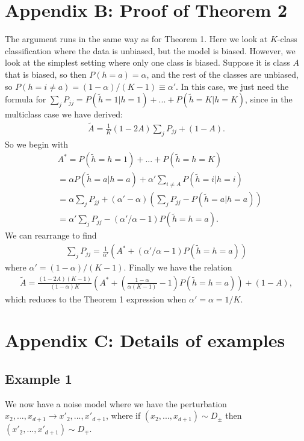 \documentclass[onecolumn,prx, superscriptaddress,longbibliography,margin=1mm 11pt]{revtex4-2}
\begin{document}
\section*{Appendix B: Proof of Theorem 2} \label{app:B}
The argument runs in the same way as for Theorem 1. Here we look at $K$-class classification where the data is unbiased, but the model is biased. However, we look at the simplest setting where only one class is biased. Suppose it is class $A$ that is biased, so then $P(h=a)=\alpha$, and the rest of the classes are unbiased, so $P(h=i \neq a)=(1-\alpha)/(K-1) \equiv \alpha'$. In this case, we just need the formula for $\sum_j P_{jj}=P(\tilde{h}=1|h=1)+...+P(\tilde{h}=K|h=K)$, since in the multiclass case we have derived:
\begin{align}
    \tilde{A}=\frac{1}{K}(1-2A)\sum_j P_{jj}+(1-A). 
\end{align}
So we begin with
\begin{align}
    & A^*=P(\tilde{h}=h=1)+...+P(\tilde{h}=h=K) \nonumber \\
    &=\alpha P(\tilde{h}=a|h=a)+\alpha'\sum_{i \neq A}P(\tilde{h}=i|h=i) \nonumber \\
    &=\alpha \sum_j P_{jj}+(\alpha'-\alpha)(\sum_j P_{jj}-P(\tilde{h}=a|h=a)) \nonumber \\
    &=\alpha' \sum_j P_{jj}-(\alpha'/\alpha-1)P(\tilde{h}=h=a).
\end{align}
We can rearrange to find
\begin{align}
    \sum_{j} P_{jj}=\frac{1}{\alpha'}(A^*+(\alpha'/\alpha-1)P(\tilde{h}=h=a))
\end{align}
where $\alpha'=(1-\alpha)/(K-1)$. Finally we have the relation
\begin{align}
    \tilde{A}=\frac{(1-2A)(K-1)}{(1-\alpha)K}\left(A^*+\left(\frac{1-\alpha}{\alpha (K-1)}-1\right)P(\tilde{h}=h=a)\right)+(1-A),
\end{align}
which reduces to the Theorem 1 expression when $\alpha'=\alpha=1/K$.
\section*{Appendix C: Details of examples}
\subsection*{Example 1} 
We now have a noise model where we have the perturbation $x_2,...,x_{d+1} \rightarrow x'_2,...,x'_{d+1}$, where if  $(x_2,...,x_{d+1}) \sim D_{\pm}$ then $(x'_2,...,x'_{d+1}) \sim D_{\mp}$. \\
\end{document}
